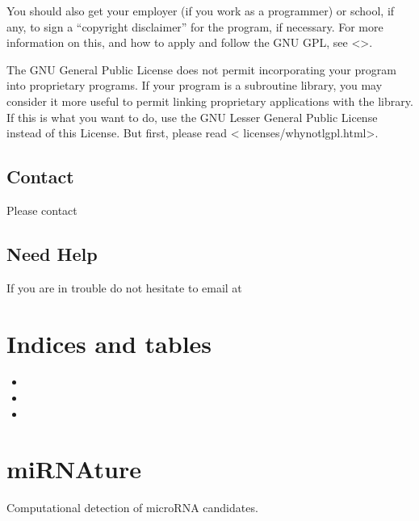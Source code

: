 \documentclass[letterpaper,10pt,english]{sphinxmanual}
\begin{document}
You should also get your employer (if you work as a programmer) or school, if any, to sign a “copyright disclaimer” for the program, if necessary. For more information on this, and how to apply and follow the GNU GPL, see \textless{}\textgreater{}.

The GNU General Public License does not permit incorporating your program into proprietary programs. If your program is a subroutine library, you may consider it more useful to permit linking proprietary applications with the library. If this is what you want to do, use the GNU Lesser General Public License instead of this License. But first, please read \textless{} licenses/why\sphinxhyphen{}not\sphinxhyphen{}lgpl.html\textgreater{}.


\section{Contact}
\label{\detokenize{license:contact}}
Please contact 


\section{Need Help}
\label{\detokenize{help:need-help}}\label{\detokenize{help::doc}}
If you are in trouble do not hesitate to email at 


\chapter{Indices and tables}
\label{\detokenize{includeme:indices-and-tables}}\begin{itemize}
\item {} 

\item {} 

\item {} 

\end{itemize}


\chapter{miRNAture}
\label{\detokenize{index:mirnature}}
Computational detection of microRNA candidates.
\end{document}
